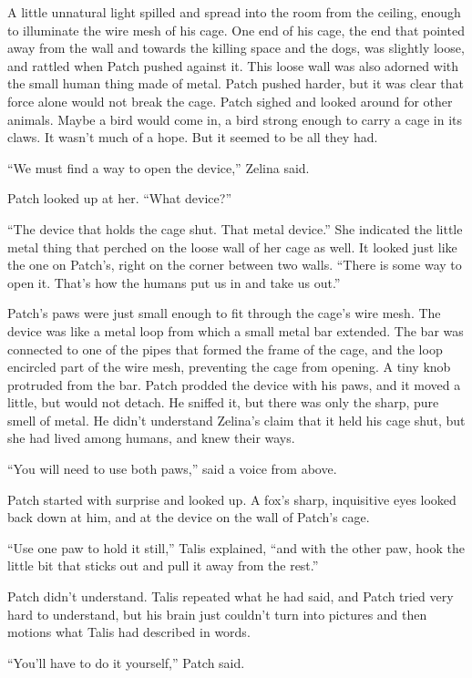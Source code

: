 \documentclass[12pt]{memoir}
\begin{document}
A little unnatural light spilled and spread into the room from the
ceiling, enough to illuminate the wire mesh of his cage. One end of
his cage, the end that pointed away from the wall and towards the
killing space and the dogs, was slightly loose, and rattled when Patch
pushed against it. This loose wall was also adorned with the small
human thing made of metal. Patch pushed harder, but it was clear that
force alone would not break the cage. Patch sighed and looked around
for other animals. Maybe a bird would come in, a bird strong enough to
carry a cage in its claws. It wasn’t much of a hope. But it seemed to
be all they had.

“We must find a way to open the device,” Zelina said.

Patch looked up at her. “What device?”

“The device that holds the cage shut. That metal device.” She
indicated the little metal thing that perched on the loose wall of her
cage as well. It looked just like the one on Patch’s, right on the
corner between two walls. “There is some way to open it. That’s how
the humans put us in and take us out.”

Patch’s paws were just small enough to fit through the cage’s wire
mesh. The device was like a metal loop from which a small metal bar
extended. The bar was connected to one of the pipes that formed the
frame of the cage, and the loop encircled part of the wire mesh,
preventing the cage from opening. A tiny knob protruded from the
bar. Patch prodded the device with his paws, and it moved a little,
but would not detach. He sniffed it, but there was only the sharp,
pure smell of metal. He didn’t understand Zelina’s claim that it held
his cage shut, but she had lived among humans, and knew their ways.

“You will need to use both paws,” said a voice from above.

Patch started with surprise and looked up. A fox’s sharp, inquisitive
eyes looked back down at him, and at the device on the wall of Patch’s
cage.

“Use one paw to hold it still,” Talis explained, “and with the other
paw, hook the little bit that sticks out and pull it away from the
rest.”

Patch didn’t understand. Talis repeated what he had said, and Patch
tried very hard to understand, but his brain just couldn’t turn into
pictures and then motions what Talis had described in words.

“You’ll have to do it yourself,” Patch said.
\end{document}
